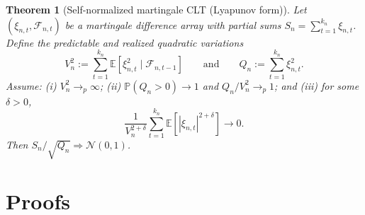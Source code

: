 \documentclass[11pt]{article}
\numberwithin{equation}{section}
\theoremstyle{plain}
\newtheorem{theorem}{Theorem}[section]
\theoremstyle{definition}
\theoremstyle{remark}
\newcommand{\E}{\mathbb{E}}
\newcommand{\Pp}{\mathbb{P}}
\newcommand{\cF}{\mathcal{F}}
\begin{document}
\begin{theorem}[Self-normalized martingale CLT (Lyapunov form)]\label{thm:selfnorm}
Let $(\xi_{n,t},\cF_{n,t})$ be a martingale difference array with partial sums $S_n=\sum_{t=1}^{k_n}\xi_{n,t}$. Define the predictable and realized quadratic variations
\[
V_n^2:=\sum_{t=1}^{k_n}\E[\xi_{n,t}^2\mid \cF_{n,t-1}]
\qquad\text{and}\qquad
Q_n:=\sum_{t=1}^{k_n}\xi_{n,t}^2.
\]
Assume: (i) $V_n^2\to_p \infty$; (ii) $\Pp(Q_n>0)\to 1$ and $Q_n/V_n^2\to_p 1$; and (iii) for some $\delta>0$,
\[
\frac{1}{V_n^{2+\delta}}\sum_{t=1}^{k_n}\E[|\xi_{n,t}|^{2+\delta}]\to 0.
\]
Then $S_n/\sqrt{Q_n}\Rightarrow \mathcal{N}(0,1)$.
\end{theorem}

\section{Proofs}\label{app:proofs}
\end{document}
